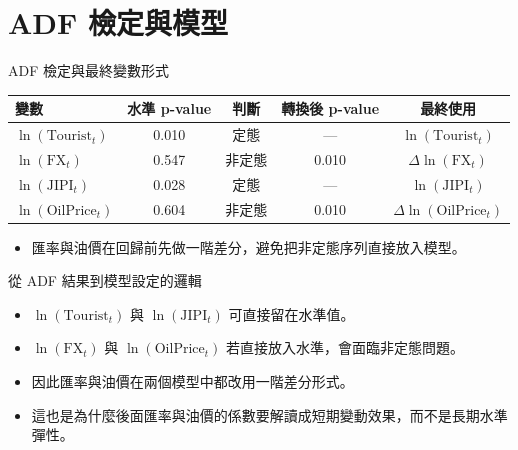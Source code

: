 \documentclass[aspectratio=169]{ctexbeamer}
\begin{document}
\section{ADF 檢定與模型}

\begin{frame}{ADF 檢定與最終變數形式}
\small
\begin{tabular}{lcccc}
\toprule
變數 & 水準 p-value & 判斷 & 轉換後 p-value & 最終使用 \\
\midrule
$\ln(\mathrm{Tourist}_t)$ & 0.010 & 定態 & --- & $\ln(\mathrm{Tourist}_t)$ \\
$\ln(\mathrm{FX}_t)$ & 0.547 & 非定態 & 0.010 & $\Delta \ln(\mathrm{FX}_t)$ \\
$\ln(\mathrm{JIPI}_t)$ & 0.028 & 定態 & --- & $\ln(\mathrm{JIPI}_t)$ \\
$\ln(\mathrm{OilPrice}_t)$ & 0.604 & 非定態 & 0.010 & $\Delta \ln(\mathrm{OilPrice}_t)$ \\
\bottomrule
\end{tabular}
\vspace{0.6em}
\begin{itemize}
  \item 匯率與油價在回歸前先做一階差分，避免把非定態序列直接放入模型。
\end{itemize}
\end{frame}

\begin{frame}{從 ADF 結果到模型設定的邏輯}
\begin{itemize}
  \item $\ln(\mathrm{Tourist}_t)$ 與 $\ln(\mathrm{JIPI}_t)$ 可直接留在水準值。
  \item $\ln(\mathrm{FX}_t)$ 與 $\ln(\mathrm{OilPrice}_t)$ 若直接放入水準，會面臨非定態問題。
  \item 因此匯率與油價在兩個模型中都改用一階差分形式。
  \item 這也是為什麼後面匯率與油價的係數要解讀成短期變動效果，而不是長期水準彈性。
\end{itemize}
\end{frame}
\end{document}
